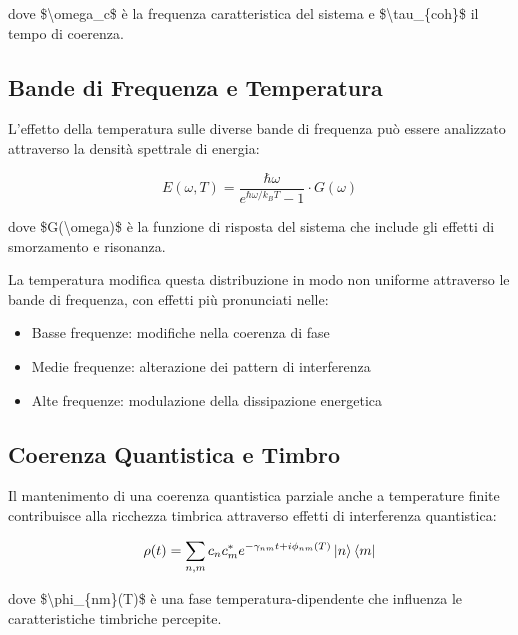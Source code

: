 \documentclass[a4paper,11pt]{article}
\begin{document}
dove \$\textbackslash{}omega\_c\$ è la frequenza caratteristica del sistema e \$\textbackslash{}tau\_\{coh\}\$
il tempo di coerenza.

\subsection{Bande di Frequenza e Temperatura}\hypertarget{bande-di-frequenza-e-temperatura}{}\label{bande-di-frequenza-e-temperatura}

L'effetto della temperatura sulle diverse bande di frequenza può essere
analizzato attraverso la densità spettrale di energia:

\begin{displaymath}
E(\omega, T) = \frac{\hbar\omega}{e^{\hbar\omega/k_BT} - 1} \cdot G(\omega)
\end{displaymath}

dove \$G(\textbackslash{}omega)\$ è la funzione di risposta del sistema che include gli
effetti di smorzamento e risonanza.

La temperatura modifica questa distribuzione in modo non uniforme
attraverso le bande di frequenza, con effetti più pronunciati nelle:

\begin{itemize}
\item{} Basse frequenze: modifiche nella coerenza di fase
\item{} Medie frequenze: alterazione dei pattern di interferenza
\item{} Alte frequenze: modulazione della dissipazione energetica
\end{itemize}

\subsection{Coerenza Quantistica e Timbro}\hypertarget{coerenza-quantistica-e-timbro}{}\label{coerenza-quantistica-e-timbro}

Il mantenimento di una coerenza quantistica parziale anche a temperature
finite contribuisce alla ricchezza timbrica attraverso effetti di
interferenza quantistica:

\begin{displaymath}
\rho(t) = \sum_{n,m} c_n c_m^* e^{-\gamma_{nm}t + i\phi_{nm}(T)} \ket{n}\bra{m}
\end{displaymath}

dove \$\textbackslash{}phi\_\{nm\}(T)\$ è una fase temperatura-dipendente che influenza le
caratteristiche timbriche percepite.
\end{document}
